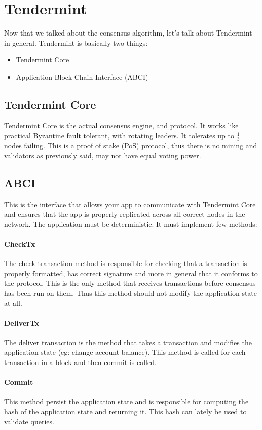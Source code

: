 \documentclass{article}
\begin{document}
	\section{Tendermint}
	Now that we talked about the consensus algorithm, let's talk about Tendermint in general. Tendermint is basically two things:
	\begin{itemize}
	 	\item Tendermint Core
	 	\item Application Block Chain Interface (ABCI)
	\end{itemize}
	\subsection{Tendermint Core}
	Tendermint Core is the actual consensus engine, and protocol. It works like practical Byzantine fault tolerant, with rotating leaders. It tolerates up to $\frac{1}{3}$ nodes failing. This is a proof of stake (PoS) protocol, thus there is no mining and validators as previously said, may not have equal voting power.
	\subsection{ABCI}
	This is the interface that allows your app to communicate with Tendermint Core and ensures that the app is properly replicated across all correct nodes in the network. The application must be deterministic. It must implement few methods:
	\paragraph{CheckTx}
	The check transaction method is responsible for checking that a transaction is properly formatted, has correct signature and more in general that it conforms to the protocol. This is the only method that receives transactions before consensus has been run on them. Thus this method should not modify the application state at all.
	\paragraph{DeliverTx}
	The deliver transaction is the method that takes a transaction and modifies the application state (eg: change account balance). This method is called for each transaction in a block and then commit is called.
	\paragraph{Commit}
	This method persist the application state and is responsible for computing the hash of the application state and returning it. This hash can lately be used to validate queries.
\end{document}
